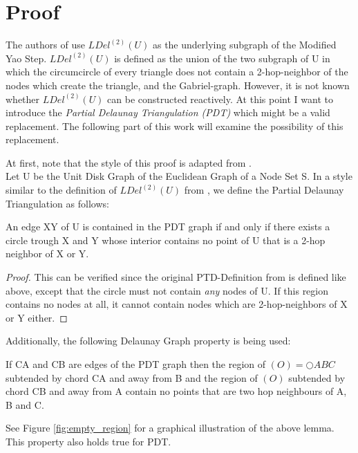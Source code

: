 \section{Proof}
The authors of \cite{kanj} use $LDel^{(2)}(U) $ as the underlying subgraph of the Modified Yao Step.
$LDel^{(2)}(U) $ is defined as the union of the two  subgraph of U in which the circumcircle of every triangle does not contain a 2-hop-neighbor of the nodes which create the triangle, and the Gabriel-graph.
However, it is not known whether $LDel^{(2)}(U) $ can be constructed reactively.
At this point I want to introduce the \emph{Partial Delaunay Triangulation (PDT)} \cite{pdt} which might be a valid replacement.
The following part of this work will examine the possibility of this replacement.

At first, note that the style of this proof is adapted from \cite{kanj}.\\
Let U be the Unit Disk Graph of the Euclidean Graph of a Node Set S.
In a style similar to the definition of $LDel^{(2)}(U) $ from \cite{kanj}, we define the Partial Delaunay Triangulation as follows:
\begin{definition}
\label{emptycircle}
An edge XY of U is contained in the PDT graph if and only if there exists a circle trough X and Y whose interior contains no point of U that is a 2-hop neighbor of X or Y.
\end{definition}
\begin{proof}
This can be verified since the original PTD-Definition from \cite{pdt} is defined like above, except that the circle must not contain \emph{any} nodes of U. 
If this region contains no nodes at all, it cannot contain nodes which are 2-hop-neighbors of X or Y either.  
\end{proof}

Additionally, the following Delaunay Graph property is being used:
\begin{lemma}
\label{emptyregion}
If CA and CB are edges of the PDT graph then the region of $(O)=\bigcirc{ABC} $ subtended by chord  CA and away from B and the region of $(O) $ subtended by chord CB and away from A contain no points that are two hop neighbours of A, B and C.
\end{lemma}


See Figure \ref{fig:empty_region} for a graphical illustration of the above lemma.
This property also holds true for PDT.

